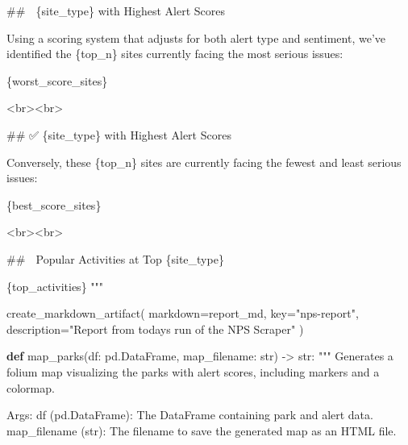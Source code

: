 \documentclass[
  letterpaper,
  DIV=11,
  numbers=noendperiod]{scrartcl}
\newenvironment{Shaded}{\begin{snugshade}}{\end{snugshade}}
\newcommand{\BuiltInTok}[1]{\textcolor[rgb]{0.00,0.23,0.31}{#1}}
\newcommand{\CommentTok}[1]{\textcolor[rgb]{0.37,0.37,0.37}{#1}}
\newcommand{\KeywordTok}[1]{\textcolor[rgb]{0.00,0.23,0.31}{\textbf{#1}}}
\newcommand{\NormalTok}[1]{\textcolor[rgb]{0.00,0.23,0.31}{#1}}
\newcommand{\OperatorTok}[1]{\textcolor[rgb]{0.37,0.37,0.37}{#1}}
\newcommand{\SpecialCharTok}[1]{\textcolor[rgb]{0.37,0.37,0.37}{#1}}
\newcommand{\SpecialStringTok}[1]{\textcolor[rgb]{0.13,0.47,0.30}{#1}}
\newcommand{\StringTok}[1]{\textcolor[rgb]{0.13,0.47,0.30}{#1}}
\begin{document}
\begin{Shaded}
\begin{Highlighting}[]
\SpecialStringTok{\#\# 🚫 }\SpecialCharTok{\{}\NormalTok{site\_type}\SpecialCharTok{\}}\SpecialStringTok{ with Highest Alert Scores}

\SpecialStringTok{Using a scoring system that adjusts for both alert type and sentiment, we’ve identified the }\SpecialCharTok{\{}\NormalTok{top\_n}\SpecialCharTok{\}}\SpecialStringTok{ sites currently facing the most serious issues:}

\SpecialCharTok{\{}\NormalTok{worst\_score\_sites}\SpecialCharTok{\}}

\SpecialStringTok{\textless{}br\textgreater{}\textless{}br\textgreater{}}

\SpecialStringTok{\#\# ✅ }\SpecialCharTok{\{}\NormalTok{site\_type}\SpecialCharTok{\}}\SpecialStringTok{ with Highest Alert Scores}

\SpecialStringTok{Conversely, these }\SpecialCharTok{\{}\NormalTok{top\_n}\SpecialCharTok{\}}\SpecialStringTok{ sites are currently facing the fewest and least serious issues:}

\SpecialCharTok{\{}\NormalTok{best\_score\_sites}\SpecialCharTok{\}}

\SpecialStringTok{\textless{}br\textgreater{}\textless{}br\textgreater{}}

\SpecialStringTok{\#\# 🥾 Popular Activities at Top }\SpecialCharTok{\{}\NormalTok{site\_type}\SpecialCharTok{\}}

\SpecialCharTok{\{}\NormalTok{top\_activities}\SpecialCharTok{\}}
\SpecialStringTok{"""}

\NormalTok{    create\_markdown\_artifact(}
\NormalTok{        markdown}\OperatorTok{=}\NormalTok{report\_md,}
\NormalTok{        key}\OperatorTok{=}\StringTok{"nps{-}report"}\NormalTok{,}
\NormalTok{        description}\OperatorTok{=}\StringTok{"Report from todays run of the NPS Scraper"}
\NormalTok{    )}

\KeywordTok{def}\NormalTok{ map\_parks(df: pd.DataFrame, map\_filename: }\BuiltInTok{str}\NormalTok{) }\OperatorTok{{-}\textgreater{}} \BuiltInTok{str}\NormalTok{:}
    \CommentTok{"""}
\CommentTok{    Generates a folium map visualizing the parks with alert scores, including markers and a colormap.}

\CommentTok{    Args:}
\CommentTok{        df (pd.DataFrame): The DataFrame containing park and alert data.}
\CommentTok{        map\_filename (str): The filename to save the generated map as an HTML file.}


\end{Highlighting}
\end{Shaded}
\end{document}
